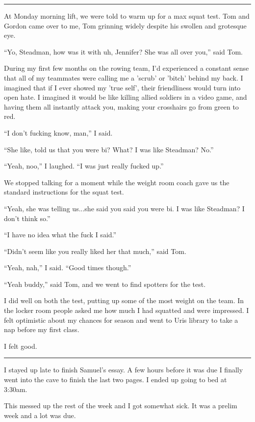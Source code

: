 \plainfancybreak{12pt}{2}{* * *}

At Monday morning lift, we were told to warm up for a max squat test.  Tom and
Gordon came over to me, Tom grinning widely despite his swollen and grotesque
eye.

``Yo, Steadman, how was it with uh, Jennifer?  She was all over you,'' said Tom.  

During my first few months on the rowing team, I'd experienced a constant sense
that all of my teammates were calling me a 'scrub' or 'bitch' behind my back.  I
imagined that if I ever showed my 'true self', their friendliness would turn
into open hate.  I imagined it would be like killing allied soldiers in a video
game, and having them all instantly attack you, making your crosshairs go from
green to red. 

``I don't fucking know, man,'' I said.

``She like, told us that you were bi?  What?  I was like Steadman?  No.''

``Yeah, noo,'' I laughed. ``I was just really fucked up.''

We stopped talking for a moment while the weight room coach gave us the standard
instructions for the squat test.

``Yeah, she was telling us...she said you said you were bi.  I was like
Steadman?  I don't think so.''

``I have no idea what the fuck I said.''

``Didn't seem like you really liked her that much,'' said Tom.

``Yeah, nah,'' I said.  ``Good times though.''

``Yeah buddy,'' said Tom, and we went to find spotters for the test.

I did well on both the test, putting up some of the most weight on the team.  In
the locker room people asked me how much I had squatted and were impressed.  I
felt optimistic about my chances for season and went to Uris library to take a
nap before my first class.

I felt good.

\plainfancybreak{12pt}{2}{* * *}

I stayed up late to finish Samuel's essay.  A few hours before it was due I
finally went into the cave to finish the last two pages.  I ended up going to
bed at 3:30am.

This messed up the rest of the week and I got somewhat sick.  It was a prelim
week and a lot was due.

